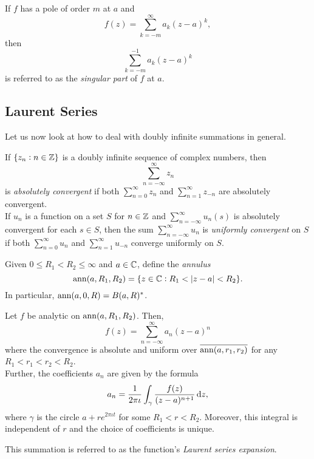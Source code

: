 	\begin{fdef}
		If $f$ has a pole of order $m$ at $a$ and
		\[ f(z) = \sum_{k=-m}^{\infty} a_{k} (z-a)^k, \]
		then
		\[ \sum_{k=-m}^{-1} a_k (z-a)^k \]
		is referred to as the \emph{singular part} of $f$ at $a$.
	\end{fdef}

\subsection{Laurent Series}

	Let us now look at how to deal with doubly infinite summations in general.

	\begin{definition}
		If $\{ z_n : n \in \mathbb{Z} \}$ is a doubly infinite sequence of complex numbers, then
		\[ \sum_{n=-\infty}^{\infty} z_n \]
		is \emph{absolutely convergent} if both $\sum_{n=0}^\infty z_n$ and $\sum_{n=1}^\infty z_{-n}$ are absolutely convergent. \\
		If $u_n$ is a function on a set $S$ for $n \in \mathbb{Z}$ and $\sum_{n=-\infty}^{\infty} u_n(s)$ is absolutely convergent for each $s \in S$, then the sum $\sum_{n=-\infty}^{\infty} u_n$ is \emph{uniformly convergent} on $S$ if both $\sum_{n=0}^{\infty} u_n$ and $\sum_{n=1}^{\infty} u_{-n}$ converge uniformly on $S$.
	\end{definition}
	
	Given $0 \le R_1 < R_2 \le \infty$ and $a \in \mathbb{C}$, define the \emph{annulus}
	\[ \operatorname{ann}(a,R_1,R_2) = \{ z \in \mathbb{C} : R_1 < |z-a| < R_2 \}. \]
	In particular, $\operatorname{ann}(a,0,R) = B(a,R)^*$.

	\begin{ftheo}
		Let $f$ be analytic on $\operatorname{ann}(a,R_1,R_2)$. Then,
		\[ f(z) = \sum_{n=-\infty}^{\infty} a_n (z-a)^n \]
		where the convergence is absolute and uniform over $\overline{\operatorname{ann}(a,r_1,r_2)}$ for any $R_1 < r_1 < r_2 < R_2$.\\
		Further, the coefficients $a_n$ are given by the formula
		\[ a_n = \frac{1}{2\pi\iota} \int_{\gamma} \frac{f(z)}{(z-a)^{n+1}} \dif z, \]
		where $\gamma$ is the circle $a+re^{2\pi\iota t}$ for some $R_1 < r < R_2$. Moreover, this integral is independent of $r$ and the choice of coefficients is unique.
	\end{ftheo}

	This summation is referred to as the function's \emph{Laurent series expansion}.

